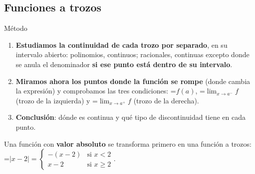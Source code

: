 \documentclass[11pt,a4paper]{article}
\newcommand{\lt}{<}\newcommand{\gt}{>}
\newcommand{\fmm}[1]{\setbox0=\hbox{$#1$}\ifdim\wd0>\linewidth\[#1\]\else\mbox{\box0}\fi}
\begin{document}
  
\subsection*{Funciones a trozos}

  
\begin{fmdef}{Método}
\begin{enumerate}
\item \textbf{Estudiamos la continuidad de cada trozo por separado}, en su intervalo abierto: polinomios, continuos; racionales, continuas excepto donde se anula el denominador \textbf{si ese punto está dentro de su intervalo}.
\item \textbf{Miramos ahora los puntos donde la función se rompe} (donde cambia la expresión) y comprobamos las tres condiciones: \fmm{f(a)}, \fmm{\lim_{x\to a^-}f} (trozo de la izquierda) y \fmm{\lim_{x\to a^+}f} (trozo de la derecha).
\item \textbf{Conclusión}: dónde es continua y qué tipo de discontinuidad tiene en cada punto.
\end{enumerate}

      
\begin{fmnote}Una función con \textbf{valor absoluto} se transforma primero en una función a trozos: \fmm{|x-2|=\begin{cases}-(x-2)&\text{si } x\lt2\\x-2&\text{si } x\geq2\end{cases}}.\end{fmnote}
\end{fmdef}
\end{document}
